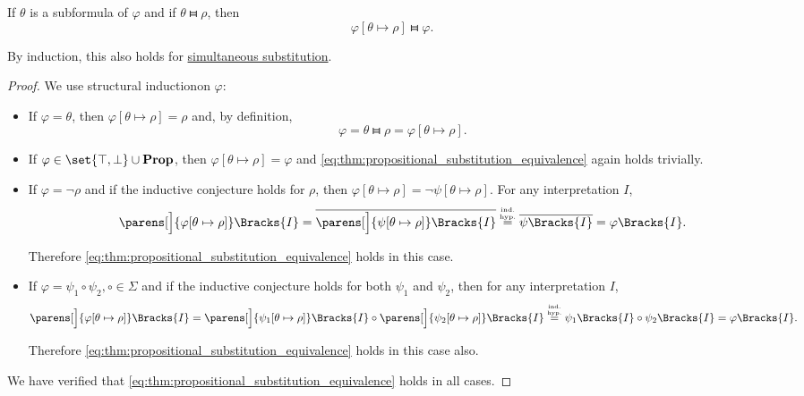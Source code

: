 \begin{proposition}\label{thm:propositional_substitution_equivalence}
  If \( \theta \) is a subformula of \( \varphi \) and if \( \theta \gleichstark \rho \), then
  \begin{equation}\label{eq:thm:propositional_substitution_equivalence}
    \varphi[\theta \mapsto \rho] \gleichstark \varphi.
  \end{equation}

  By induction, this also holds for \hyperref[def:propositional_substitution/simultaneous]{simultaneous substitution}.
\end{proposition}
\begin{proof}
  We use structural induction\IND on \( \varphi \):

  \begin{itemize}
    \item If \( \varphi = \theta \), then \( \varphi[\theta \mapsto \rho] = \rho \) and, by definition,
    \begin{equation*}
      \varphi = \theta \gleichstark \rho = \varphi[\theta \mapsto \rho].
    \end{equation*}

    \item If \( \varphi \in \set{ \top, \bot } \cup \boldop{Prop} \), then \( \varphi[\theta \mapsto \rho] = \varphi \) and \eqref{eq:thm:propositional_substitution_equivalence} again holds trivially.

    \item If \( \varphi = \neg \rho \) and if the inductive conjecture holds for \( \rho \), then \( \varphi[\theta \mapsto \rho] = \neg \psi[\theta \mapsto \rho] \). For any interpretation \( I \),
    \begin{equation*}
      \parens[\Big]{ \varphi[\theta \mapsto \rho] }\Bracks{I}
      =
      \overline{\parens[\Big]{ \psi[\theta \mapsto \rho] }\Bracks{I}}
      \overset {\IndHyp} =
      \overline{\psi\Bracks{I}}
      =
      \varphi\Bracks{I}.
    \end{equation*}

    Therefore \eqref{eq:thm:propositional_substitution_equivalence} holds in this case.

    \item If \( \varphi = \psi_1 \circ \psi_2, \circ \in \Sigma \) and if the inductive conjecture holds for both \( \psi_1 \) and \( \psi_2 \), then for any interpretation \( I \),
    \begin{equation*}
      \parens[\Big]{ \varphi[\theta \mapsto \rho] }\Bracks{I}
      =
      \parens[\Big]{ \psi_1[\theta \mapsto \rho] }\Bracks{I} \circ \parens[\Big]{ \psi_2[\theta \mapsto \rho] }\Bracks{I}
      \overset {\IndHyp} =
      \psi_1\Bracks{I} \circ \psi_2\Bracks{I}
      =
      \varphi\Bracks{I}.
    \end{equation*}

    Therefore \eqref{eq:thm:propositional_substitution_equivalence} holds in this case also.
  \end{itemize}

  We have verified that \eqref{eq:thm:propositional_substitution_equivalence} holds in all cases.
\end{proof}

